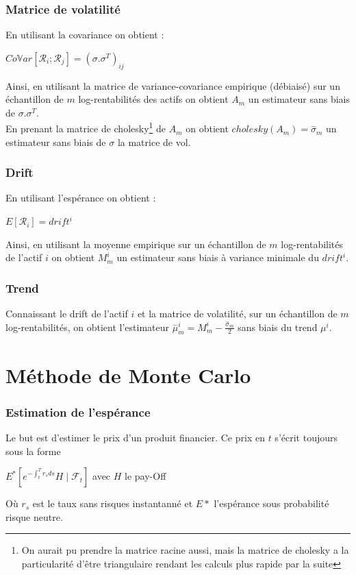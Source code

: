 \documentclass[a4paper,12pt]{article}
\begin{document}
\subsubsection{Matrice de volatilité}
En utilisant la covariance on obtient : 
\begin{center}
$Co\mathbb{V}ar\left[\mathcal{R}_i;\mathcal{R}_j\right]=(\sigma.\sigma^T)_{ij}$
\end{center}
Ainsi, en utilisant la matrice de variance-covariance empirique (débiaisé) sur un échantillon de $m$ log-rentabilités des actifs on obtient $A_m$ un estimateur sans biais de $\sigma.\sigma^T$. \\
En prenant la matrice de cholesky\footnote{On aurait pu prendre la matrice racine aussi, mais la matrice de cholesky a la particularité d'être triangulaire rendant les calculs plus rapide par la suite} de $A_m$ on obtient $cholesky(A_m)=\overset{-}{\sigma}_m$ un estimateur sans biais de $\sigma$ la matrice de vol.
\subsubsection{Drift}
En utilisant l'espérance on obtient : 
\begin{center}
$E\left[\mathcal{R}_i\right]=drift^i$
\end{center}
Ainsi, en utilisant la moyenne empirique sur un échantillon de $m$ log-rentabilités de l'actif $i$ on obtient $M^i_m$ un estimateur sans biais à variance minimale du $drift^i$.
\subsubsection{Trend}
Connaissant le drift de l'actif $i$ et la matrice de volatilité, sur un échantillon de $m$ log-rentabilités, on obtient l'estimateur $\overset{-}{\mu}^i_m=M^i_m-\frac{\overset{-}{\sigma}_m}{2}$ sans biais du trend $\mu^i$.
\section{Méthode de Monte Carlo}
\subsubsection{Estimation de l'espérance}
Le but est d'estimer le prix d'un produit financier. Ce prix en $t$ s'écrit toujours sous la forme \begin{center}
 $E^*\left[e^{-\int_t^Tr_sds}H\mid\mathcal{F}_t\right]$ avec $H$ le pay-Off
 \end{center}
 Où $r_s$ est le taux sans risques instantanné et $E*$ l'espérance sous probabilité risque neutre. \\
 
\end{document}
